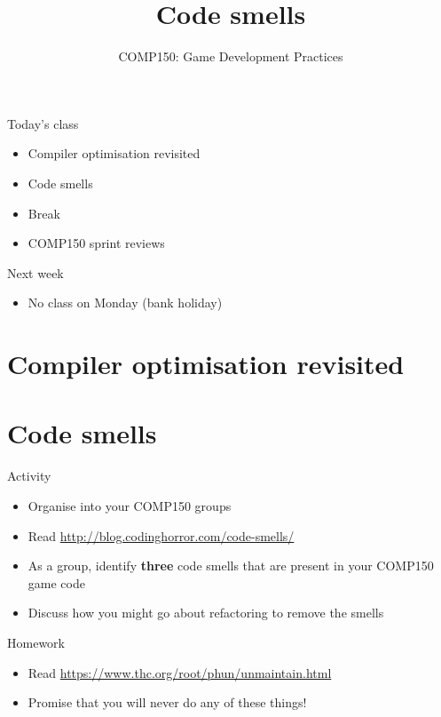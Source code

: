 \usepackage{../../beamerthemeFalmouthGamesAcademy}
\usepackage{multimedia}
\graphicspath{ {../../} }


\usepackage[normalem]{ulem}
\usepackage{wasysym}

\usepackage{pdfpages}

\usetikzlibrary{arrows,automata}


\title{Code smells}
\subtitle{COMP150: Game Development Practices}

\frame{\titlepage} 

\begin{frame}{Today's class}
    \begin{itemize}
        \item Compiler optimisation revisited
        \item Code smells
        \item Break
        \item COMP150 sprint reviews
    \end{itemize}
\end{frame}

\begin{frame}{Next week}
    \begin{itemize}
        \item No class on Monday (bank holiday)
    \end{itemize}
\end{frame}

\part{Compiler optimisation revisited}
\frame{\partpage}

\part{Code smells}
\frame{\partpage}

\begin{frame}{Activity}
    \begin{itemize}
        \item Organise into your COMP150 groups
        \item Read \url{http://blog.codinghorror.com/code-smells/}
        \item As a group, identify \textbf{three} code smells that are present in your COMP150 game code
        \item Discuss how you might go about refactoring to remove the smells
    \end{itemize}
\end{frame}

\begin{frame}{Homework}
    \begin{itemize}
        \item Read \url{https://www.thc.org/root/phun/unmaintain.html}
        \item Promise that you will never do any of these things!
    \end{itemize}
\end{frame}



